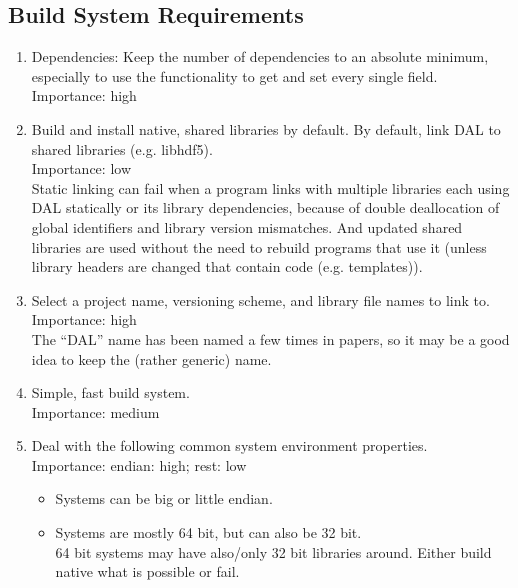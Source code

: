 \documentclass[a4paper,11pt]{article}
\begin{document}
\subsection{Build System Requirements} \label{sec:build_system_reqs}
\begin{enumerate}[resume, label=\it R.\arabic{*}]
\itemsep0em

\item \label{req:min_deps} Dependencies: Keep the number of dependencies to an absolute minimum, especially to use the functionality to get and set every single field.\\
Importance: high\\

\item \label{req:libs} Build and install native, shared libraries by default. By default, link DAL to shared libraries (e.g. libhdf5).\\
Importance: low\\
Static linking can fail when a program links with multiple libraries each using DAL statically or its library dependencies, because of double deallocation of global identifiers and library version mismatches.
And updated shared libraries are used without the need to rebuild programs that use it (unless library headers are changed that contain code (e.g. templates)).

\item \label{req:naming_versioning} Select a project name, versioning scheme, and library file names to link to.\\
Importance: high\\
The ``DAL'' name has been named a few times in papers, so it may be a good idea to keep the (rather generic) name.

\item \label{req:build_complexity} Simple, fast build system.\\
Importance: medium\\

\item \label{req:sys_env} Deal with the following common system environment properties.\\
Importance: endian: high; rest: low
\begin{itemize}
\itemsep0em

\item Systems can be big or little endian.

\item Systems are mostly 64 bit, but can also be 32 bit.\\
64 bit systems may have also/only 32 bit libraries around. Either build native what is possible or fail.


\end{itemize}
\end{enumerate}
\end{document}
